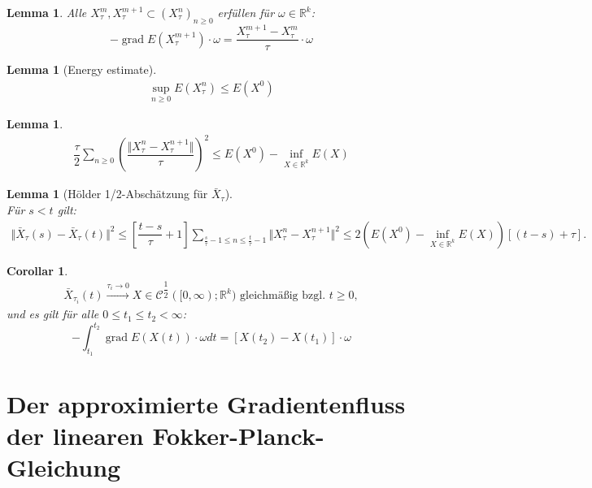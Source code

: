 \documentclass[11pt,a4paper,notitlepage]{scrreprt}
\newcommand{\RR}{\mathbb{R}}
\newcommand{\grad}{\operatorname{grad}}
\newtheorem{cor}[defi]{Corollar}
\newtheorem{lem}[defi]{Lemma}
\begin{document}
\begin{lem}
Alle $X_\tau^m,X_\tau^{m+1}\subset(X_\tau^n)_{n\geq 0}$ erfüllen für $\omega\in\RR^k$: \\
\begin{equation}
-\grad E(X_\tau^{m+1})\cdot\omega= \dfrac{ X_\tau^{m+1}-X_\tau^m}{\tau}\cdot\omega
\end{equation}
\end{lem}

 

\begin{lem}[Energy estimate]
\begin{eqnarray*}
\sup_{n\geq 0}E(X_\tau^n)\leq E(X^0) \label{enest}
\end{eqnarray*}
\end{lem}


\begin{lem}
\begin{eqnarray*}
\dfrac{\tau}{2}\sum_{n\geq 0} \left(\dfrac{\Vert X_\tau^n-X_\tau^{n+1}\Vert}{\tau}\right)^2\leq E(X^0)-\inf_{X\in\RR^k} E(X)\label{totalsquare}
\end{eqnarray*}
\end{lem}


\begin{lem}[Hölder 1/2-Abschätzung für $\bar{X}_\tau$]  $~~$ \\
Für $s<t$ gilt:
\begin{eqnarray*}
\Vert \bar{X}_\tau(s)-\bar{X}_\tau(t)\Vert^2 \leq \left[\dfrac{t-s}{\tau}+1\right] \sum_{\frac{s}{\tau}-1\leq n \leq \frac{t}{\tau}-1} \Vert X^n_\tau- X_\tau^{n+1}\Vert^2 \leq 2(E(X^0)-\inf_{X\in\RR^k} E(X))[(t-s)+\tau]. \label{Hölder}
\end{eqnarray*}
\end{lem}

\begin{cor}
\begin{eqnarray*}
\bar{X}_{\tau_i}(t) \overset{\tau_i\to0}{\longrightarrow} X \in \mathcal{C}^{\dfrac{1}{2}}([0,\infty);\RR^k) \text{ gleichmäßig bzgl. }t\geq 0,
\end{eqnarray*}
und es gilt für alle $0\leq t_1\leq t_2<\infty$:
\begin{equation}
-\int_{t_1}^{t_2}\grad E(X(t))\cdot \omega dt = [X(t_2)-X(t_1)]\cdot\omega
\end{equation}
\end{cor}

\newpage
\section{Der approximierte Gradientenfluss der linearen Fokker-Planck-Gleichung}
\end{document}
